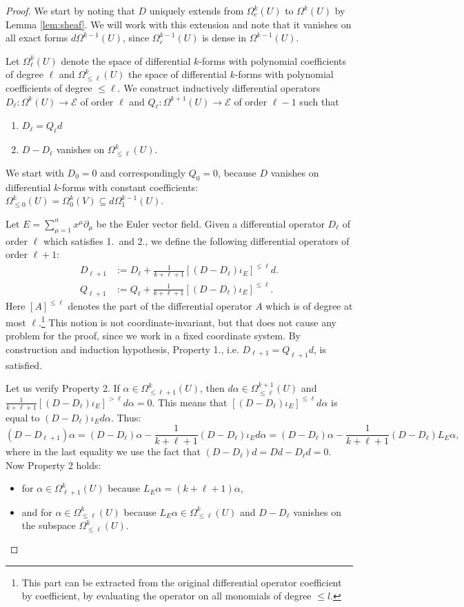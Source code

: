 \documentclass{article}
\theoremstyle{definition}
\begin{document}
\begin{proof}
We start by noting that $D$ uniquely extends from $\Omega^k_c(U)$ to $\Omega^k(U)$ by Lemma \ref{lem:sheaf}. We will work with this extension and note that it vanishes on all exact forms $d\Omega^{k-1}(U)$, since $\Omega^{k-1}_c(U)$ is dense in $\Omega^{k-1}(U)$.

Let $\Omega^k_{\ell}(U)$ denote the space of differential $k$-forms with polynomial coefficients of degree $\ell$ and  $\Omega^k_{\le\ell}(U)$ the space of differential $k$-forms with polynomial coefficients of degree $\le\ell$. We construct inductively differential operators $D_\ell:\Omega^{k}(U)\to \mathcal E$ of order $\ell$ and $Q_\ell:\Omega^{k+1}(U)\to \mathcal E$ of order $\ell-1$  such that 
    \begin{enumerate}
    \item $D_\ell=Q_\ell d$ 
    \item $D-D_\ell$ vanishes on $\Omega^k_{\le\ell}(U)$.
\end{enumerate}
We start with $D_0=0$ and correspondingly $Q_0=0$, because $D$ vanishes on differential $k$-forms with constant coefficients: $\Omega^k_{\le 0}(U)=\Omega^k_0(V)\subseteq d\Omega^{k-1}_1(U)$. 

Let $E = \sum_{\mu=1}^{n}x^\mu\partial_{\mu}$ be the Euler vector field.
Given a differential operator $D_\ell$ of order $\ell$ which satisfies 1.\ and 2., we define the following differential operators of order $\ell+1$:
    \begin{align*}
        D_{\ell+1}&:=D_{\ell}+\frac{1}{k+\ell+1}[(D-D_\ell)\iota_E]^{\le\ell}d.\\
        Q_{\ell+1}&:=Q_\ell+\frac{1}{k+\ell+1}[(D-D_\ell)\iota_E]^{\le\ell}.
    \end{align*}
Here $[A]^{\leq \ell}$ denotes the part of the differential operator $A$ which is of degree at most $\ell$.\footnote{This part can be extracted from the original differential operator coefficient by coefficient, by evaluating the operator on all monomials of degree $\leq l$.} This notion is not coordinate-invariant, but that does not cause any problem for the proof, since we work in a fixed coordinate system. By construction and induction hypothesis, Property 1., i.e. $D_{\ell+1}=Q_{\ell+1}d$, is satisfied. 
    
Let us verify Property 2. If $\alpha\in\Omega^{k}_{\le\ell+1}(U)$, then $d\alpha\in\Omega^{k+1}_{\le\ell}(U)$ and $\frac{1}{k+\ell+1}[(D-D_\ell)\iota_E]^{>\ell}d\alpha=0$. This means that $[(D-D_\ell)\iota_E]^{\le\ell}d\alpha$ is equal to $(D-D_\ell)\iota_E d\alpha$. Thus: 
$$(D-D_{\ell+1})\alpha=(D-D_\ell)\alpha-\frac{1}{k+\ell+1}(D-D_\ell)\iota_Ed\alpha=(D-D_\ell)\alpha-\frac{1}{k+\ell+1}(D-D_\ell)L_E\alpha,$$
where in the last equality we use the fact that $(D-D_\ell)d=Dd-D_{\ell}d=0$. Now Property 2 holds:
\begin{itemize}
	\item for $\alpha\in\Omega^k_{\ell+1}(U)$ because 
	$L_E\alpha=(k+\ell+1)\alpha$,
	\item and for $\alpha\in\Omega^k_{\le\ell}(U)$ because $L_E\alpha\in\Omega^k_{\le\ell}(U)$ and $D-D_\ell$ vanishes on the subspace $\Omega^k_{\le\ell}(U)$. 
\end{itemize} 


\end{proof}
\end{document}
